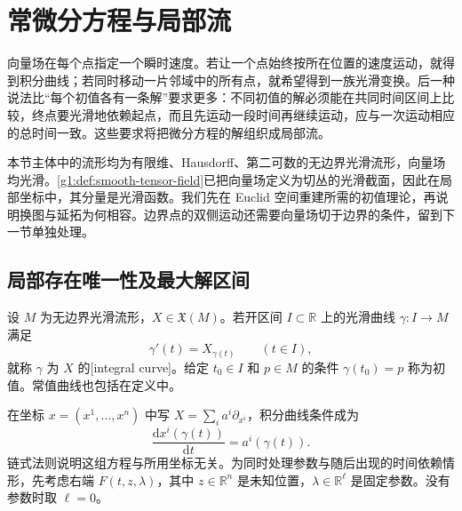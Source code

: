 
% 
% 

\section{常微分方程与局部流}
\label{g1:sec:1301}

向量场在每个点指定一个瞬时速度。若让一个点始终按所在位置的速度运动，就得到积分曲线；若同时移动一片邻域中的所有点，就希望得到一族光滑变换。后一种说法比“每个初值各有一条解”要求更多：不同初值的解必须能在共同时间区间上比较，终点要光滑地依赖起点，而且先运动一段时间再继续运动，应与一次运动相应的总时间一致。这些要求将把微分方程的解组织成局部流。

\ProseParagraphBreak

本节主体中的流形均为有限维、Hausdorff、第二可数的无边界光滑流形，向量场均光滑。\cref{g1:def:smooth-tensor-field}已把向量场定义为切丛的光滑截面，因此在局部坐标中，其分量是光滑函数。我们先在 Euclid 空间重建所需的初值理论，再说明换图与延拓为何相容。边界点的双侧运动还需要向量场切于边界的条件，留到下一节单独处理。

\subsection{局部存在唯一性及最大解区间}
\label{g1:subsec:1301:01}

\begin{definition}
	\label{g1:def:integral-curve}
	设 \(M\) 为无边界光滑流形，\(X\in\mathfrak X(M)\)。若开区间 \(I\subset\mathbb R\) 上的光滑曲线 \(\gamma:I\to M\) 满足
	\[
		\gamma'(t)=X_{\gamma(t)}\qquad(t\in I),
	\]
	就称 \(\gamma\) 为 \(X\) 的[integral curve]。给定 \(t_0\in I\) 和 \(p\in M\) 的条件 \(\gamma(t_0)=p\) 称为初值。常值曲线也包括在定义中。
\end{definition}

在坐标 \(x=(x^1,\ldots,x^n)\) 中写 \(X=\sum_i a^i\partial_{x^i}\)，积分曲线条件成为
\[
	\frac{\mathrm{d}x^i(\gamma(t))}{\mathrm{d}t}=a^i(\gamma(t)).
\]
链式法则说明这组方程与所用坐标无关。为同时处理参数与随后出现的时间依赖情形，先考虑右端 \(F(t,z,\lambda)\)，其中 \(z\in\mathbb R^n\) 是未知位置，\(\lambda\in\mathbb R^\ell\) 是固定参数。没有参数时取 \(\ell=0\)。

